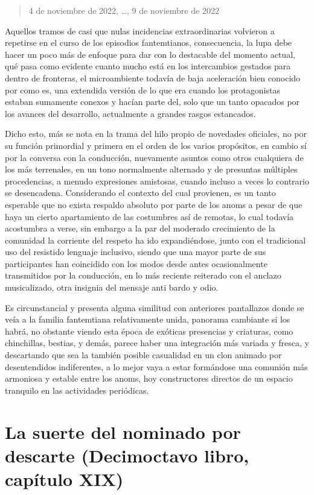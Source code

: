 \documentclass[
]{book}
\begin{document}
\begin{quote}
4 de noviembre de 2022, \ldots, 9 de noviembre de 2022
\end{quote}

Aquellos tramos de casi que nulas incidencias extraordinarias volvieron a repetirse en el curso de los episodios fantemtianos, consecuencia, la lupa debe hacer un poco más de enfoque para dar con lo destacable del momento actual, qué pasa como evidente cuanto mucho está en los intercambios gestados para dentro de fronteras, el microambiente todavía de baja aceleración bien conocido por como es, una extendida versión de lo que era cuando los protagonistas estaban sumamente conexos y hacían parte del, solo que un tanto opacados por los avances del desarrollo, actualmente a grandes rasgos estancados.

Dicho esto, más se nota en la trama del hilo propio de novedades oficiales, no por su función primordial y primera en el orden de los varios propósitos, en cambio sí por la conversa con la conducción, nuevamente asuntos como otros cualquiera de los más terrenales, en un tono normalmente alternado y de presuntas múltiples procedencias, a menudo expresiones amistosas, cuando incluso a veces lo contrario se desencadena. Considerando el contexto del cual provienen, es un tanto esperable que no exista respaldo absoluto por parte de los anoms a pesar de que haya un cierto apartamiento de las costumbres así de remotas, lo cual todavía acostumbra a verse, sin embargo a la par del moderado crecimiento de la comunidad la corriente del respeto ha ido expandiéndose, junto con el tradicional uso del resistido lenguaje inclusivo, siendo que una mayor parte de sus participantes han coincidido con los modos desde antes ocasionalmente transmitidos por la conducción, en lo más reciente reiterado con el anclazo musicalizado, otra insignia del mensaje anti bardo y odio.

Es circunstancial y presenta alguna similitud con anteriores pantallazos donde se veía a la familia fantemtiana relativamente unida, panorama cambiante si los habrá, no obstante viendo esta época de exóticas presencias y criaturas, como chinchillas, bestias, y demás, parece haber una integración más variada y fresca, y descartando que sea la también posible casualidad en un clon animado por desentendidos indiferentes, a lo mejor vaya a estar formándose una comunión más armoniosa y estable entre los anoms, hoy constructores directos de un espacio tranquilo en las actividades periódicas.

\hypertarget{la-suerte-del-nominado-por-descarte-decimoctavo-libro-capuxedtulo-xix}{%
\section{La suerte del nominado por descarte (Decimoctavo libro, capítulo XIX)}\label{la-suerte-del-nominado-por-descarte-decimoctavo-libro-capuxedtulo-xix}}
\end{document}

